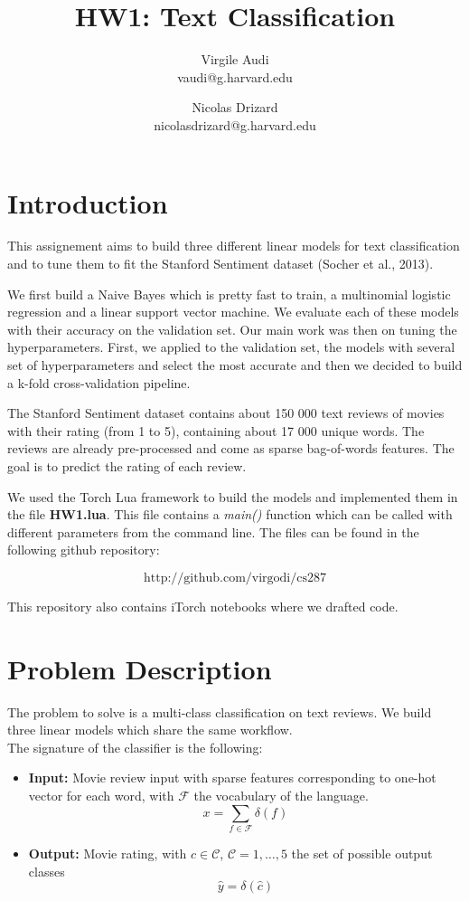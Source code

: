 \documentclass[11pt]{article}
\title{HW1: Text Classification}
\author{Virgile Audi \\ vaudi@g.harvard.edu \and Nicolas Drizard \\ nicolasdrizard@g.harvard.edu }
\begin{document}
\maketitle{}
\section{Introduction}

This assignement aims to build three different linear models for text classification and to tune them to fit the Stanford Sentiment dataset (Socher et al., 2013).

We first build a Naive Bayes which is pretty fast to train, a multinomial logistic regression and a linear support vector machine. We evaluate each of these models with their accuracy on the validation set. Our main work was then on tuning the hyperparameters. First, we applied to the validation set, the models with several set of hyperparameters and select the most accurate and then we decided to build a k-fold cross-validation pipeline.

The Stanford Sentiment dataset contains about 150 000 text reviews of movies with their rating (from 1 to 5), containing about 17 000 unique words. The reviews are already pre-processed and come as sparse bag-of-words features. The goal is to predict the rating of each review.

We used the Torch Lua framework to build the models and implemented them in the file \textbf{HW1.lua}. This file contains a \textit{main()} function which can be called with different parameters from the command line. The files can be found in the following github repository:

$$\text{http://github.com/virgodi/cs287}$$

This repository also contains iTorch notebooks where we drafted code.


\section{Problem Description}

The problem to solve is a multi-class classification on text reviews. We build three linear models which share the same workflow.\\

\noindent The signature of the classifier is the following:

\begin{itemize}
	\item \textbf{Input:} Movie review input with sparse features corresponding to one-hot vector for each word, with $\mathcal{F}$ the vocabulary of the language.
	\[ x = \sum_{f \in \mathcal{F}} \delta(f) \]
	\item \textbf{Output:} Movie rating, with $c \in \mathcal{C}$, $\mathcal{C} = {1, \hdots, 5}$ the set of possible output classes
	\[ \hat{y} = \delta(\hat{c})\]
\end{itemize}
\end{document}
